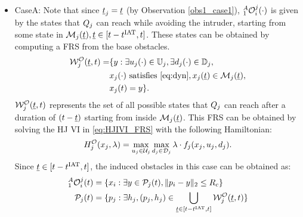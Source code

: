 \begin{itemize}[leftmargin=*] 
\item \label{sec:intruderObs_case1_caseA} CaseA: Note that since $\underline{t}_j = \underline{t}$ (by Observation \ref{obs1_case1}), $_1^A\mathcal{O}_i^j(\cdot)$ is given by the states that $Q_j$ can reach while avoiding the intruder, starting from some state in $\mathcal{M}_j(\underline{t}), \underline{t} \in [t-t^\text{IAT}, t]$. These states can be obtained by computing a FRS from the base obstacles.
\begin{equation} \label{eq:ObsFRS_case1_caseA}
\begin{aligned}
\frs_{j}^{\mathcal{O}}(\tsa, t) = & \{y: \exists \ctrl_j(\cdot) \in \cfset_j, \exists \dstb_j(\cdot) \in \dfset_j, \\
& \state_j(\cdot) \text{ satisfies \eqref{eq:dyn}}, \state_j(\tsa) \in \boset_j(\tsa), \\
& \state_j(t) = y\}.
\end{aligned}
\end{equation}
$\mathcal{W}_{j}^{\mathcal{O}}(\underline{t}, t)$ represents the set of all possible states that $Q_j$ can reach after a duration of $(t-\underline{t})$ starting from inside $\mathcal{M}_j(\underline{t})$. This FRS can be obtained by solving the HJ VI in \eqref{eq:HJIVI_FRS} with the following Hamiltonian:
\begin{equation}
H_{j}^{\mathcal{O}}(x_j, \lambda) = \max_{u_j \in \mathcal{U}_j} \max_{d_j \in \mathcal{D}_j} \lambda \cdot f_j (x_j, u_j, d_j).
\end{equation} 
Since $\underline{t} \in [t-t^\text{IAT}, t]$, the induced obstacles in this case can be obtained as:
\begin{equation} \label{eq:intruderObs_case1_caseA} 
\begin{aligned}
_1^A\ioset_i^j(t) & = \{\state_i: \exists y \in \pfrs_j(t), \|\pos_i - y\|_2 \le \rc \}\\
\pfrs_j(t) & = \{p_j: \exists \npos_j, (p_j, \npos_j) \in \bigcup_{\tsa \in [t-\iat, t]} \frs_{j}^{\mathcal{O}}(\tsa, t) \}
\end{aligned}
\end{equation}


\end{itemize}

